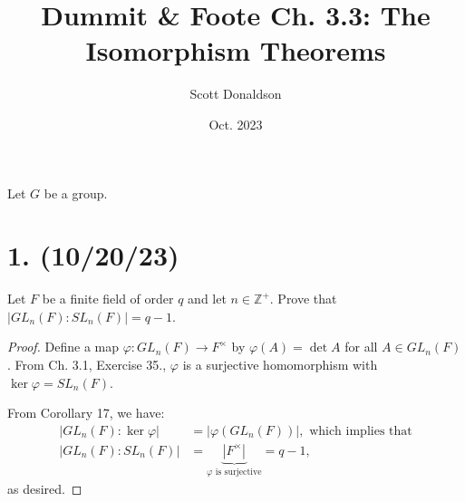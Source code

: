 \documentclass{article}
\title{Dummit \& Foote Ch. 3.3: The Isomorphism Theorems}
\author{Scott Donaldson}
\date{Oct. 2023}
\begin{document}
\maketitle

Let $G$ be a group.

\section*{1. (10/20/23)}

Let $F$ be a finite field of order $q$ and let $n \in \mathbb{Z}^+$. Prove that \\ $|GL_n(F) : SL_n(F)| = q - 1$.

\begin{proof}
    Define a map $\varphi: GL_n(F) \rightarrow F^\times$ by $\varphi(A) = \det A$ for all $A \in GL_n(F)$. From Ch. 3.1, Exercise 35., $\varphi$ is a surjective homomorphism with $\ker \varphi = SL_n(F)$.

    From Corollary 17, we have:
    \begin{align*}
        |GL_n(F) : \ker \varphi| &= |\varphi(GL_n(F))|, \text{ which implies that} \\
        |GL_n(F) : SL_n(F)| &= \underbrace{|F^\times|}_\text{$\varphi$ is surjective} = q - 1,
    \end{align*}
    as desired.
\end{proof}




            
\end{document}
